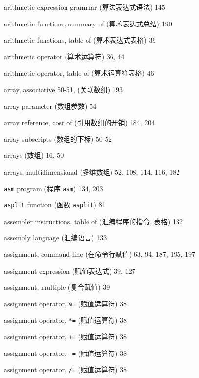 \begin{multicols}{3}
\hangindent=3pc  arithmetic expression grammar (算法表达式语法) 145

\hangindent=3pc  arithmetic functions, summary of
(算术表达式总结) 190

\hangindent=3pc  arithmetic functions, table of
(算术表达式表格) 39

\hangindent=3pc  arithmetic operator (算术运算符) 36, 44

\hangindent=3pc  arithmetic operator, table of (算术运算符表格) 46

\hangindent=3pc  array, associative 50-51, (关联数组) 193

\hangindent=3pc  array parameter (数组参数) 54

\hangindent=3pc  array reference, cost of (引用数组的开销) 184, 204

\hangindent=3pc  array subscripts (数组的下标) 50-52

\hangindent=3pc  arrays (数组) 16, 50

\hangindent=3pc  arrays, multidimensional (多维数组) 52, 108, 114, 116, 182

\hangindent=3pc  \verb'asm' program (程序 \verb'asm') 134, 203

\hangindent=3pc  \verb'asplit' function (函数 \verb'asplit') 81

\hangindent=3pc  assembler instructions, table of
(汇编程序的指令, 表格) 132

\hangindent=3pc  assembly language (汇编语言) 133

\hangindent=3pc  assignment, command-line (在命令行赋值) 63, 94, 187, 195, 197

\hangindent=3pc  assignment expression (赋值表达式) 39, 127

\hangindent=3pc  assignment, multiple (复合赋值) 39

\hangindent=3pc  assignment operator, \verb'%=' (赋值运算符) 38

\hangindent=3pc  assignment operator, \verb'*=' (赋值运算符) 38

\hangindent=3pc  assignment operator, \verb'+=' (赋值运算符) 38

\hangindent=3pc  assignment operator, \verb'-=' (赋值运算符) 38

\hangindent=3pc  assignment operator, \verb'/=' (赋值运算符) 38


\end{multicols}
